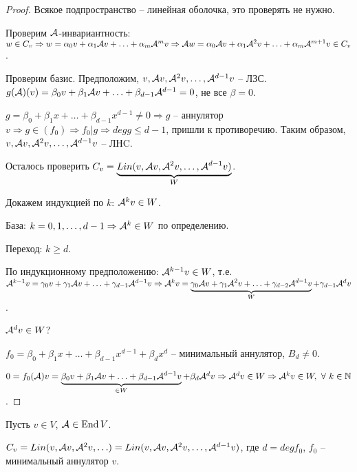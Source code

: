 \documentclass[main]{subfiles}
\begin{document}
\begin{proof}
    Всякое подпространство -- линейная оболочка, это проверять не нужно.

    Проверим $\mathcal{A}$-инвариантность: $w \in C_v \Rightarrow w = \alpha_0 v + \alpha_1 \mathcal{A} v + \ldots + \alpha_m {\mathcal{A}}^{m} v \Rightarrow
        \mathcal{A} w = \alpha_0 \mathcal{A} v + \alpha_1 {\mathcal{A}}^2 v + \ldots + \alpha_m {\mathcal{A}}^{m+1} v \in C_v$.

    Проверим базис. Предположим, $v, \mathcal{A} v, {\mathcal{A}}^2 v, \ldots, {\mathcal{A}}^{d-1} v$ -- ЛЗС. $g(\mathcal{A})(v) = \beta_0 v + \beta_1 \mathcal{A} v + \ldots + \beta_{d-1} {\mathcal{A}}^{d-1} = 0$, не все $\beta = 0$.

    $g = \beta_0 + \beta_1 x + \ldots + \beta_{d-1} x^{d-1} \neq 0 \Rightarrow
        g$ -- аннулятор $v \Rightarrow g \in (f_0) \Rightarrow f_0|g \Rightarrow deg g \leq d-1$, пришли к противоречию.
    Таким образом, $v, \mathcal{A} v, {\mathcal{A}}^2 v, \ldots, {\mathcal{A}}^{d-1} v$ -- ЛНC.

    Осталось проверить $C_v = \underbrace{Lin(v, \mathcal{A} v, {\mathcal{A}}^2 v, \ldots, {\mathcal{A}}^{d-1} v)}_{W}$.

    Докажем индукцией по $k$: ${\mathcal{A}}^{k} v \in W$.

    База: $k = 0, 1, \ldots, d-1 \Rightarrow {\mathcal{A}}^k \in W$ по определению.

    Переход: $k\geq d$.

    По индукционному предположению: ${\mathcal{A}}^{k-1} v \in W$,
    т.е. ${\mathcal{A}}^{k-1}v = \gamma_0 v + \gamma_1 \mathcal{A} v + \ldots + \gamma_{d-1} {\mathcal{A}}^{d-1} v \Rightarrow
        {\mathcal{A}}^k v = \underbrace{\gamma_0 \mathcal{A} v + \gamma_1 {\mathcal{A}}^2 v + \ldots + \gamma_{d-2} {\mathcal{A}}^{d-1} v}_{W} + \gamma_{d-1} {\mathcal{A}}^d v$.

    ${\mathcal{A}}^d v \in W$?

    $f_0 = \beta_0 + \beta_1 x + \ldots + \beta_{d-1} x^{d-1} + \beta_d x^d$ -- минимальный аннулятор, $B_d \neq 0$.

    $0 = f_0(\mathcal{A}) v = \underbrace{\beta_0 v +\beta_1 \mathcal{A} v + \ldots + \beta_{d-1} {\mathcal{A}}^{d-1} v}_{\in W} + \beta_d {\mathcal{A}}^d v \Rightarrow {\mathcal{A}}^d v \in W \Rightarrow
        {\mathcal{A}}^k v \in W, \  \forall \ k \in \mathbb{N}$.

\end{proof}


Пусть $v \in V$, $\mathcal{A} \in \operatorname{End} V$.

$C_v = Lin(v, \mathcal{A} v, {\mathcal{A}}^2 v, \ldots) = Lin(v, \mathcal{A} v, {\mathcal{A}}^2 v, \ldots, {\mathcal{A}}^{d-1} v)$, где $d = deg f_0$, $f_0$ -- минимальный аннулятор $v$.
\end{document}
